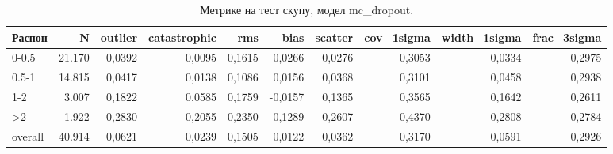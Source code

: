 \begin{table}[htbp]
\centering
\caption{Метрике на тест скупу, модел mc_dropout.}
\label{tab:metrics-mc_dropout}
\begin{tabular}{lrrrrrrrrr}
\toprule
Распон & N & outlier & catastrophic & rms & bias & scatter & cov_1sigma & width_1sigma & frac_3sigma \\
\midrule
0-0.5 & 21.170 & 0,0392 & 0,0095 & 0,1615 & 0,0266 & 0,0276 & 0,3053 & 0,0334 & 0,2975 \\
0.5-1 & 14.815 & 0,0417 & 0,0138 & 0,1086 & 0,0156 & 0,0368 & 0,3101 & 0,0458 & 0,2938 \\
1-2 & 3.007 & 0,1822 & 0,0585 & 0,1759 & -0,0157 & 0,1365 & 0,3565 & 0,1642 & 0,2611 \\
>2 & 1.922 & 0,2830 & 0,2055 & 0,2350 & -0,1289 & 0,2607 & 0,4370 & 0,2808 & 0,2784 \\
overall & 40.914 & 0,0621 & 0,0239 & 0,1505 & 0,0122 & 0,0362 & 0,3170 & 0,0591 & 0,2926 \\
\bottomrule
\end{tabular}
\end{table}